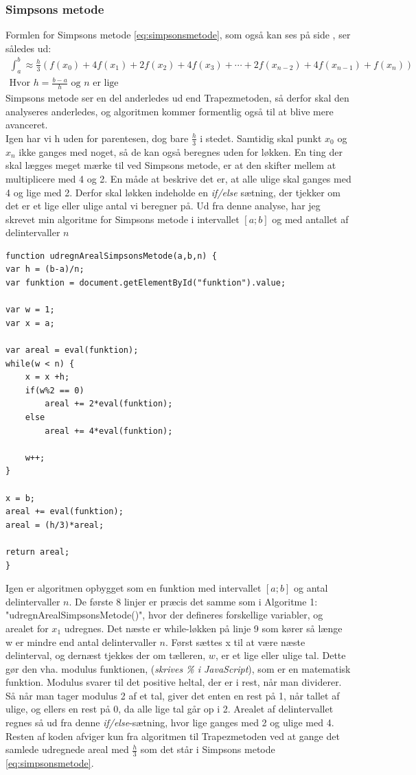 \documentclass[12pt]{article}
\numberwithin{equation}{section}
\begin{document}
\subsubsection{Simpsons metode}
Formlen for Simpsons metode \eqref{eq:simpsonsmetode}, som også kan ses på side \pageref{eq:simpsonsmetode}, ser således ud:
\begin{align}
\int_{a}^{b} \approx \frac{h}{3}(f(x_0) + 4f(x_1) + 2f(x_2) + 4f(x_3) + \cdots + 2f(x_{n-2}) + 4f(x_{n-1}) + f(x_n) ) \nonumber
\\ \text{Hvor } h=\frac{b-a}{h} \text{ og $n$ er lige} \nonumber
\end{align}
Simpsons metode ser en del anderledes ud end Trapezmetoden, så derfor skal den analyseres anderledes, og algoritmen kommer formentlig også til at blive mere avanceret.\\
Igen har vi h uden for parentesen, dog bare $\frac{h}{3}$ i stedet. Samtidig skal punkt $x_0$ og $x_n$ ikke ganges med noget, så de kan også beregnes uden for løkken. En ting der skal lægges meget mærke til ved Simpsons metode, er at den skifter mellem at multiplicere med 4 og 2. En måde at beskrive det er, at alle ulige skal ganges med 4 og lige med 2. Derfor skal løkken indeholde en \emph{if/else} sætning, der tjekker om det er et lige eller ulige antal vi beregner på. Ud fra denne analyse, har jeg skrevet min algoritme for Simpsons metode i intervallet $[a;b]$ og med antallet af delintervaller $n$

\begin{lstlisting}[caption="udregnArealSimpsonsMetode()"]
function udregnArealSimpsonsMetode(a,b,n) {
var h = (b-a)/n;
var funktion = document.getElementById("funktion").value;

var w = 1;
var x = a;

var areal = eval(funktion);
while(w < n) {
	x = x +h;
	if(w%2 == 0)
		areal += 2*eval(funktion);
	else
		areal += 4*eval(funktion);
	
	w++;
}

x = b;
areal += eval(funktion);
areal = (h/3)*areal;

return areal;
}
\end{lstlisting}

Igen er algoritmen opbygget som en funktion med intervallet $[a;b]$ og antal delintervaller $n$. De første 8 linjer er præcis det samme som i Algoritme 1: "udregnArealSimpsonsMetode()", hvor der defineres forskellige variabler, og arealet for $x_1$ udregnes. Det næste er while-løkken på linje 9 som kører så længe w er mindre end antal delintervaller $n$. Først sættes x til at være næste delinterval, og dernæst tjekkes der om tælleren, $w$, er et lige eller ulige tal. Dette gør den vha. modulus funktionen, (\emph{skrives \% i JavaScript}), som er en matematisk funktion. Modulus svarer til det positive heltal, der er i rest, når man dividerer. Så når man tager modulus 2 af et tal, giver det enten en rest på 1, når tallet af ulige, og ellers en rest på 0, da alle lige tal går op i 2. Arealet af delintervallet regnes så ud fra denne \emph{if/else}-sætning, hvor lige ganges med 2 og ulige med 4.
\\Resten af koden afviger kun fra algoritmen til Trapezmetoden ved at gange det samlede udregnede areal med $\frac{h}{3}$ som det står i Simpsons metode \eqref{eq:simpsonsmetode}.
\end{document}
